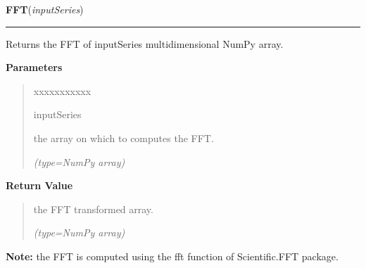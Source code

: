 \hspace{.8\funcindent}\begin{boxedminipage}{\funcwidth}

    \raggedright \textbf{FFT}(\textit{inputSeries})

    \vspace{-1.5ex}

    \rule{\textwidth}{0.5\fboxrule}
\setlength{\parskip}{2ex}
    Returns the FFT of {\textbar}inputSeries{\textbar} multidimensional 
    NumPy array.

\setlength{\parskip}{1ex}
      \textbf{Parameters}
      \vspace{-1ex}

      \begin{quote}
        \begin{Ventry}{xxxxxxxxxxx}

          \item[inputSeries]

          the array on which to computes the FFT.

            {\it (type=NumPy array)}

        \end{Ventry}

      \end{quote}

      \textbf{Return Value}
    \vspace{-1ex}

      \begin{quote}
      the FFT transformed array.

      {\it (type=NumPy array)}

      \end{quote}

\textbf{Note:} the FFT is computed using the fft function of Scientific.FFT package.



    \end{boxedminipage}

    \label{nMOLDYN:Core:Mathematics:invFFT}

    \vspace{0.5ex}

